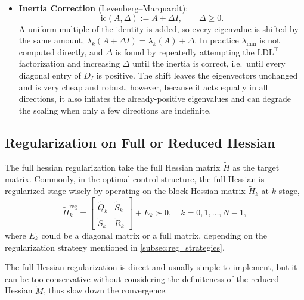 \documentclass[class=scrbook, crop=false]{standalone}
\begin{document}
\begin{itemize}
    This avoids the cost of an eigendecomposition and still guarantees positive definiteness, 
    but the resulting $E$ is generally not minimal and depends on the variable ordering, so it tends to over-modify $A$ compared with the eigenvalue-based methods.

    \item \textbf{Inertia Correction} (Levenberg--Marquardt):
    \begin{equation*}
        \mathrm{ic}(A, \Delta) := A + \Delta I, \qquad \Delta \geq 0.
    \end{equation*}
    A uniform multiple of the identity is added, so every eigenvalue is shifted by the same amount, $\lambda_k(A + \Delta I) = \lambda_k(A) + \Delta$.
    In practice $\lambda_{\min}$ is not computed directly, and $\Delta$ is found by repeatedly attempting the $\mathrm{LD}\mathrm{L}^\top$ factorization
    and increasing $\Delta$ until the inertia is correct, i.e.\ until every diagonal entry of $D_I$ is positive.
    The shift leaves the eigenvectors unchanged and is very cheap and robust,
    however, because it acts equally in all directions, it also inflates the already-positive eigenvalues and can degrade the scaling when only a few directions are indefinite.

\end{itemize}


\subsection{Regularization on Full or Reduced Hessian}
\label{subsec:full_hessian}
The full hessian regularization take the full Hessian matrix $\tilde{H}$ as the target matrix.
Commonly, in the optimal control structure, the full Hessian is regularized stage-wisely 
by operating on the block Hessian matrix $\tilde{H}_k$ at $k$ stage,
\begin{equation}
    \label{eq:regularized_system}
    \tilde{H}_k^\mathrm{reg} =  
    \begin{bmatrix}
    \tilde{Q}_k & \tilde{S}_k^\top \\
    \tilde{S}_k & \tilde{R}_k
    \end{bmatrix} + E_k \succ 0, \quad k = 0, 1, \ldots, N-1,
\end{equation}
where $E_k$ could be a diagonal matrix or a full matrix, depending on the regularization strategy mentioned in \ref{subsec:reg_strategies}.

The full Hessian regularization is direct and usually simple to implement, 
but it can be too conservative without considering the definiteness of the reduced Hessian $\tilde{M}$, 
thus slow down the convergence.
\end{document}
